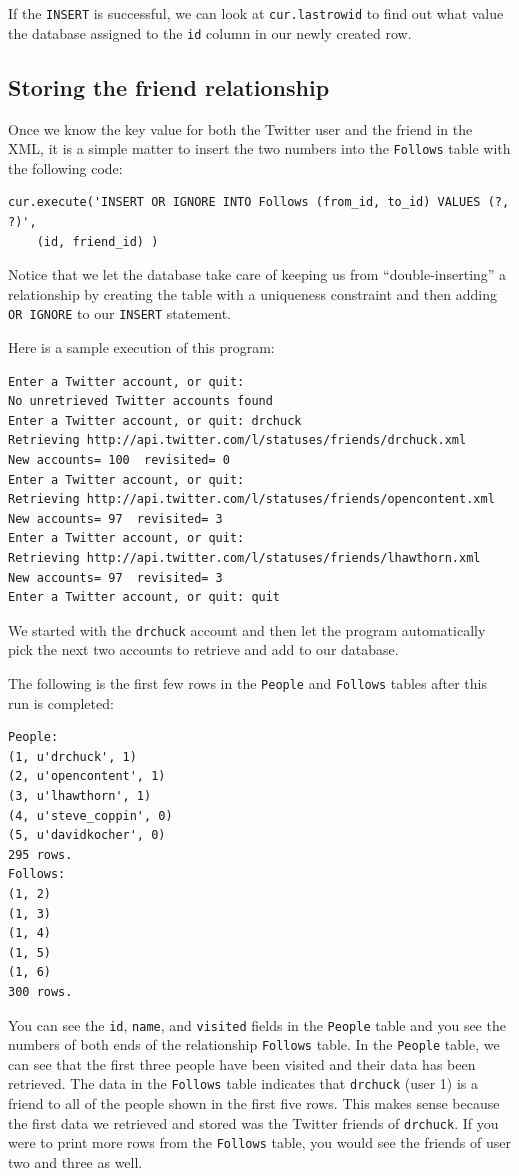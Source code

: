 \documentclass[11pt]{book}
\begin{document}
If the {\tt INSERT} is successful, we can look at {\tt cur.lastrowid} 
to find out what value the database assigned to the {\tt id} column in 
our newly created row.

\subsection{Storing the friend relationship}

Once we know the key value for both the Twitter user
and the friend in the XML, it is a simple matter to insert
the two numbers into the {\tt Follows} table
with the following code:

\beforeverb
\begin{verbatim}
cur.execute('INSERT OR IGNORE INTO Follows (from_id, to_id) VALUES (?, ?)',
    (id, friend_id) )
\end{verbatim}
\afterverb
%
Notice that we let the database take care of keeping us from ``double-inserting''
a relationship by creating the table with a uniqueness constraint and then
adding {\tt OR IGNORE} to our {\tt INSERT} statement.

Here is a sample execution of this program:

\beforeverb
\begin{verbatim}
Enter a Twitter account, or quit: 
No unretrieved Twitter accounts found
Enter a Twitter account, or quit: drchuck
Retrieving http://api.twitter.com/l/statuses/friends/drchuck.xml
New accounts= 100  revisited= 0
Enter a Twitter account, or quit: 
Retrieving http://api.twitter.com/l/statuses/friends/opencontent.xml
New accounts= 97  revisited= 3
Enter a Twitter account, or quit: 
Retrieving http://api.twitter.com/l/statuses/friends/lhawthorn.xml
New accounts= 97  revisited= 3
Enter a Twitter account, or quit: quit
\end{verbatim}
\afterverb
%
We started with the {\tt drchuck} account and then let the program
automatically pick the next two accounts to retrieve and add to 
our database.

The following is the first few rows in the {\tt People} 
and {\tt Follows} tables after this run is completed:

\beforeverb
\begin{verbatim}
People:
(1, u'drchuck', 1)
(2, u'opencontent', 1)
(3, u'lhawthorn', 1)
(4, u'steve_coppin', 0)
(5, u'davidkocher', 0)
295 rows.
Follows:
(1, 2)
(1, 3)
(1, 4)
(1, 5)
(1, 6)
300 rows.
\end{verbatim}
\afterverb
%
You can see the {\tt id}, {\tt name}, and {\tt visited} fields in the 
{\tt People} table and you see the numbers of both ends of 
the relationship {\tt Follows} table.   
In the {\tt People} table, we can see that the first three people
have been visited and their data has been retrieved.
The data in the {\tt Follows} table indicates that
{\tt drchuck} (user 1) is a friend to all of the people shown in the first
five rows.  This makes sense because
the first data we retrieved and stored was the Twitter friends of
{\tt drchuck}.  If you were to print more rows from the {\tt Follows} table,
you would see the friends of user two and three as well.
\end{document}
